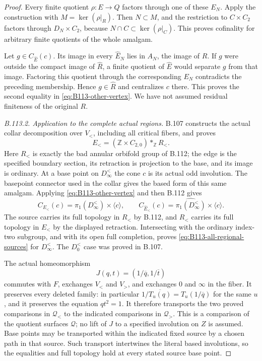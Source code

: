 \begin{proof}
Every finite quotient $\rho:E\to Q$ factors through one of these
$E_N$. Apply the construction with
$M=\ker(\rho|_R)$. Then $N\subset M$, and the restriction to
$C\times C_2$ factors through $D_N\times C_2$, because
$N\cap C\subset\ker(\rho|_C)$. This proves cofinality for
arbitrary finite quotients of the whole amalgam.

Let $g\in C_{\widehat E}(c)$. Its image in every
$\widehat E_N$ lies in $A_N$, the image of $R$. If $g$ were
outside the compact image of $\widehat R$, a finite quotient of
$\widehat E$ would separate $g$ from that image. Factoring this
quotient through the corresponding $E_N$ contradicts the preceding
membership. Hence $g\in\widehat R$ and centralizes $c$ there.
This proves the second equality in \eqref{eq:B113-other-vertex}.
We have not assumed residual finiteness of the original $R$.

\emph{B.113.2. Application to the complete actual regions.}
B.107 constructs the actual collar decomposition over $V_<$,
including all critical fibers, and proves
\[
 E_<=(\mathbb Z\times C_{2,0})*_{\mathbb Z}R_<.
\]
Here $R_<$ is exactly the bad annular orbifold group of B.112;
the edge is the specified boundary section, its retraction is
projection to the base, and its image is ordinary. At a base
point on $D_\infty^<$ the cone $c$ is its actual odd involution.
The basepoint connector used in the collar gives the based form
of this same amalgam. Applying \eqref{eq:B113-other-vertex} and
then B.112 gives
\[
 C_{E_<}(c)=\pi_1(D_\infty^<)\times\langle c\rangle,
 \qquad
 C_{\widehat E_<}(c)
    =\widehat{\pi_1(D_\infty^<)}\times\langle c\rangle.
\]
The source carries its full topology in $R_<$ by B.112, and
$R_<$ carries its full topology in $E_<$ by the displayed
retraction. Intersecting with the ordinary index-two subgroup,
and with its open full completion, proves
\eqref{eq:B113-all-regional-sources} for $D_\infty^<$.
The $D_0^<$ case was proved in B.107.

The actual homeomorphism
\[
 J(q,t)=(1/\overline q,1/\overline t)
\]
commutes with $F$, exchanges $V_<$ and $V_>$, and exchanges
$0$ and $\infty$ in the fiber. It preserves every deleted
family: in particular
$1/\overline{T_u(q)}=T_u(1/\overline q)$ for the same $u$,
and it preserves the equation $qt^2=1$. It therefore transports
the two proved comparisons in $\mathscr Q_<$ to the indicated
comparisons in $\mathscr Q_>$. This is a comparison of the
quotient surfaces $\mathscr Q$; no lift of $J$ to a specified
involution on $Z$ is assumed. Base points may be transported
within the indicated fixed source by a chosen path in that
source. Such transport intertwines the literal based involutions,
so the equalities and full topology hold at every stated source
base point.


\end{proof}
